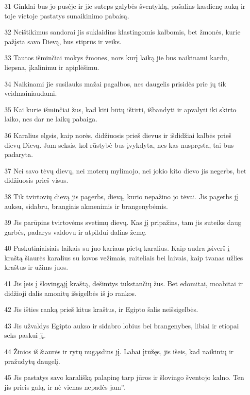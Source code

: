 \par 31 Ginklai bus jo pusėje ir jie suteps galybės šventyklą, pašalins kasdienę auką ir toje vietoje pastatys sunaikinimo pabaisą. 
\par 32 Neištikimus sandorai jis suklaidins klastingomis kalbomis, bet žmonės, kurie pažįsta savo Dievą, bus stiprūs ir veiks. 
\par 33 Tautos išminčiai mokys žmones, nors kurį laiką jie bus naikinami kardu, liepsna, įkalinimu ir apiplėšimu. 
\par 34 Naikinami jie susilauks mažai pagalbos, nes daugelis prisidės prie jų tik veidmainiaudami. 
\par 35 Kai kurie išminčiai žus, kad kiti būtų ištirti, išbandyti ir apvalyti iki skirto laiko, nes dar ne laikų pabaiga. 
\par 36 Karalius elgsis, kaip norės, didžiuosis prieš dievus ir išdidžiai kalbės prieš dievų Dievą. Jam seksis, kol rūstybė bus įvykdyta, nes kas nuspręsta, tai bus padaryta. 
\par 37 Nei savo tėvų dievų, nei moterų mylimojo, nei jokio kito dievo jis negerbs, bet didžiuosis prieš visus. 
\par 38 Tik tvirtovių dievą jis pagerbs, dievą, kurio nepažino jo tėvai. Jis pagerbs jį auksu, sidabru, brangiais akmenimis ir brangenybėmis. 
\par 39 Jis parūpins tvirtovėms svetimų dievų. Kas jį pripažins, tam jis suteiks daug garbės, padarys valdovu ir atpildui dalins žemę. 
\par 40 Paskutiniaisiais laikais su juo kariaus pietų karalius. Kaip audra įsiverš į kraštą šiaurės karalius su kovos vežimais, raiteliais bei laivais, kaip tvanas užlies kraštus ir užims juos. 
\par 41 Jis įeis į šlovingąjį kraštą, dešimtys tūkstančių žus. Bet edomitai, moabitai ir didžioji dalis amonitų išsigelbės iš jo rankos. 
\par 42 Jis išties ranką prieš kitus kraštus, ir Egipto šalis neišsigelbės. 
\par 43 Jis užvaldys Egipto aukso ir sidabro lobius bei brangenybes, libiai ir etiopai seks paskui jį. 
\par 44 Žinios iš šiaurės ir rytų nugąsdins jį. Labai įtūžęs, jis išeis, kad naikintų ir pražudytų daugelį. 
\par 45 Jis pastatys savo karališką palapinę tarp jūros ir šlovingo šventojo kalno. Ten jis prieis galą, ir nė vienas nepadės jam”.



